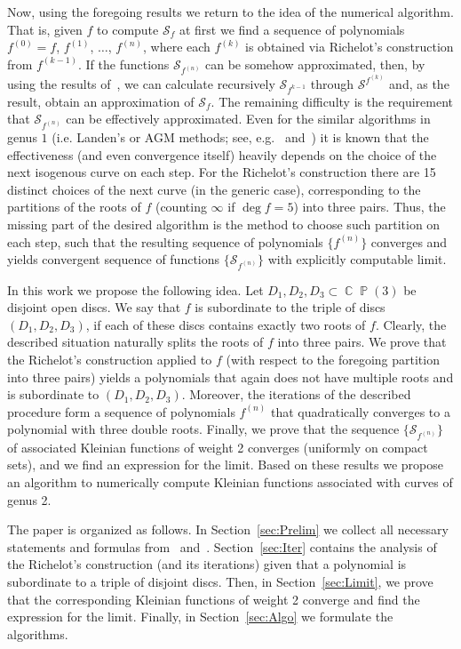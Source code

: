 \documentclass{amsart}
\numberwithin{equation}{section}
\theoremstyle{definition}
\theoremstyle{remark}
\DeclareMathOperator{\CC}{\mathbb C}
\DeclareMathOperator{\PP}{\mathbb P}
\begin{document}
	Now, using the foregoing results we return to the idea of the numerical algorithm. That is, given $f$ to compute $\mathscr S_f$ at first we find a sequence of polynomials $f^{(0)} = f$, $f^{(1)}$, $\dots$, $f^{(n)}$, where each $f^{(k)}$ is obtained via Richelot's construction from $f^{(k-1)}$. If the functions $\mathscr S_{f^{(n)}}$ can be somehow approximated, then, by using the results of~\cite{RichelotExpression}, we can calculate recursively $\mathscr S_{f^{k-1}}$ through $\mathscr S^{f^{(k)}}$ and, as the result, obtain an approximation of $\mathscr S_f$. The remaining difficulty is the requirement that $\mathscr S_{f^{(n)}}$ can be effectively approximated. Even for the similar algorithms in genus $1$ (i.e. Landen's or AGM methods; see, e.g.~\cite{Cremona} and~\cite{Smirnov}) it is known that the effectiveness (and even convergence itself) heavily depends on the choice of the next isogenous curve on each step. For the Richelot's construction there are 15 distinct choices of the next curve (in the generic case), corresponding to the partitions of the roots of $f$ (counting $\infty$ if $\deg f = 5$) into three pairs. Thus, the missing part of the desired algorithm is the method to choose such partition on each step, such that the resulting sequence of polynomials $\{f^{(n)}\}$ converges and yields convergent sequence of functions $\{\mathscr S_{f^{(n)}}\}$ with explicitly computable limit.
	
	In this work we propose the following idea. Let $D_1, D_2, D_3 \subset \CC\PP(3)$ be disjoint open discs. We say that $f$ is subordinate to the triple of discs $(D_1,D_2,D_3)$, if each of these discs contains exactly two roots of $f$. Clearly, the described situation naturally splits the roots of $f$ into three pairs. We prove that the Richelot's construction applied to $f$ (with respect to the foregoing partition into three pairs) yields a polynomials that again does not have multiple roots and is subordinate to $(D_1,D_2,D_3)$. Moreover, the iterations of the described procedure form a sequence of polynomials $f^{(n)}$ that quadratically converges to a polynomial with three double roots. Finally, we prove that the sequence $\{\mathscr S_{f^{(n)}}\}$ of associated Kleinian functions of weight 2 converges (uniformly on compact sets), and we find an expression for the limit. Based on these results we propose an algorithm to numerically compute Kleinian functions associated with curves of genus 2.
	
	The paper is organized as follows. In Section~\ref{sec:Prelim} we collect all necessary statements and formulas from~\cite{KleinianWeight2} and~\cite{RichelotExpression}. Section~\ref{sec:Iter} contains the analysis of the Richelot's construction (and its iterations) given that a polynomial is subordinate to a triple of disjoint discs. Then, in Section~\ref{sec:Limit}, we prove that the corresponding Kleinian functions of weight 2 converge and find the expression for the limit. Finally, in Section~\ref{sec:Algo} we formulate the algorithms.
\end{document}
